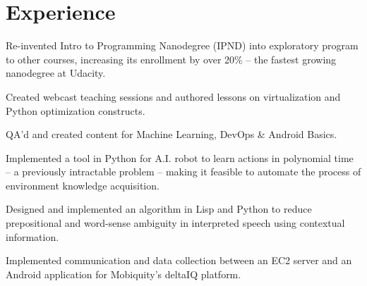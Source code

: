 \documentclass[]{deedy-resume-openfont}
\begin{document}
\begin{minipage}[t]{0.66\textwidth} 


\section{Experience}

\vspace{\topsep} %
\begin{tightemize}

\item Re-invented Intro to Programming Nanodegree (IPND) into exploratory program to other courses, increasing its enrollment by over 20\% -- the fastest growing nanodegree at Udacity.

\item Created webcast teaching sessions and authored lessons on virtualization and Python optimization constructs.

\item QA'd and created content for Machine Learning, DevOps \& Android Basics.

\end{tightemize}
\sectionsep

\begin{tightemize}
\item Implemented a tool in Python for A.I. robot to learn actions in polynomial time -- a previously intractable problem -- making it feasible to automate the process of environment knowledge acquisition.

\item Designed and implemented an algorithm in Lisp and Python to reduce prepositional and word-sense ambiguity in interpreted speech using contextual information.
\end{tightemize}
\sectionsep

\begin{tightemize}
\item Implemented communication and data collection between an EC2 server and an Android application for Mobiquity’s deltaIQ platform.


\end{tightemize}
\end{minipage}
\end{document}
